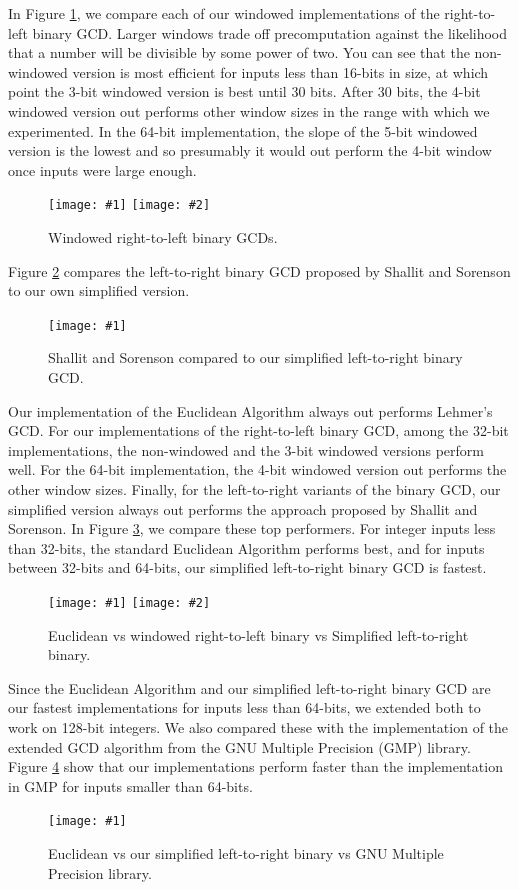 \documentclass{ucalgthes1}
\theoremstyle{definition}
\newcommand{\mygraph}[3]{
	\begin{figure}[H]
	\centering
	\texttt{[image: \#1]}
	\caption{#3}
	\label{#2}
	\end{figure}
}
\newcommand{\mygraphTwo}[4]{
	\begin{figure}[H]
	\centering
	\texttt{[image: \#1]}
	\texttt{[image: \#2]}
	\caption{#4}
	\label{#3}
	\end{figure}
}
\begin{document}
In Figure \ref{fig:steins}, we compare each of our windowed implementations of the right-to-left binary GCD.  Larger windows trade off precomputation against the likelihood that a number will be divisible by some power of two. You can see that the non-windowed version is most efficient for inputs less than 16-bits in size, at which point the 3-bit windowed version is best until 30 bits.  After 30 bits, the 4-bit windowed version out performs other window sizes in the range with which we experimented.  In the 64-bit implementation, the slope of the 5-bit windowed version is the lowest and so presumably it would out perform the 4-bit window once inputs were large enough.
\mygraphTwo{steins-32}{steins-64}{fig:steins}{Windowed right-to-left binary GCDs.}

Figure \ref{fig:shallit-vs-binary_l2r} compares the left-to-right binary GCD proposed by Shallit and Sorenson to our own simplified version.
\mygraph{shallit-vs-binary_l2r}{fig:shallit-vs-binary_l2r}{Shallit and Sorenson compared to our simplified left-to-right binary GCD.}

Our implementation of the Euclidean Algorithm always out performs Lehmer's GCD.  For our implementations of the right-to-left binary GCD, among the 32-bit implementations, the non-windowed and the 3-bit windowed versions perform well.  For the 64-bit implementation, the 4-bit windowed version out performs the other window sizes.  Finally, for the left-to-right variants of the binary GCD, our simplified version always out performs the approach proposed by Shallit and Sorenson.  In Figure \ref{fig:all-gcd}, we compare these top performers.  For integer inputs less than 32-bits, the standard Euclidean Algorithm performs best, and for inputs between 32-bits and 64-bits, our simplified left-to-right binary GCD is fastest.
\mygraphTwo{all-32}{all-64}{fig:all-gcd}{Euclidean vs windowed right-to-left binary vs Simplified left-to-right binary.}

Since the Euclidean Algorithm and our simplified left-to-right binary GCD are our fastest implementations for inputs less than 64-bits, we extended both to work on 128-bit integers.  We also compared these with the implementation of the extended GCD algorithm from the GNU Multiple Precision (GMP) library.  Figure \ref{fig:mpzgcd} show that our implementations perform faster than the implementation in GMP for inputs smaller than 64-bits.
\mygraph{mpzgcd}{fig:mpzgcd}{Euclidean vs our simplified left-to-right binary vs GNU Multiple Precision library.}
\end{document}
